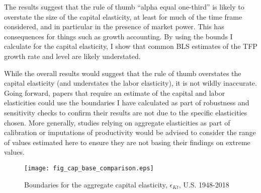 \documentclass[11pt]{article}
\begin{document}
The results suggest that the rule of thumb ``alpha equal one-third'' is likely to overstate the size of the capital elasticity, at least for much of the time frame considered, and in particular in the presence of market power. This has consequences for things such as growth accounting. By using the bounds I calculate for the capital elasticity, I show that common BLS estimates of the TFP growth rate and level are likely understated.

While the overall results would suggest that the rule of thumb overstates the capital elasticity (and understates the labor elasticity), it is not wildly inaccurate. Going forward, papers that require an estimate of the capital and labor elasticities could use the boundaries I have calculated as part of robustness and sensitivity checks to confirm their results are not due to the specific elasticities chosen. More generally, studies relying on aggregate elasticities as part of calibration or imputations of productivity would be advised to consider the range of values estimated here to ensure they are not basing their findings on extreme values.

\newpage

\clearpage

\onehalfspacing
{\small


}

\clearpage

\begin{figure}[!htb]
\begin{center}
\caption{Boundaries for the aggregate capital elasticity, $\epsilon_{Kt}$, U.S. 1948-2018}
\label{FIG_cap_comparison}
\texttt{[image: fig\_cap\_base\_comparison.eps]}
\end{center}
\vspace{-.5cm}
\end{figure}
\end{document}
